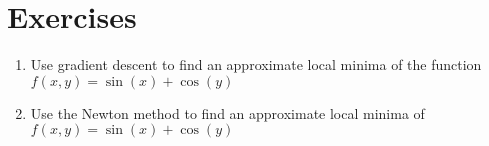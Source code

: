 \documentclass[book.tex]{subfiles}
\begin{document}

% 
% 

\section{Exercises}
\begin{enumerate}
    \item Use gradient descent to find an approximate local minima of the function $f(x,y) = \sin(x) + \cos(y)$
    \item Use the Newton method to find an approximate local minima of $f(x, y) = \sin(x) + \cos(y)$
\end{enumerate}
\end{document}
